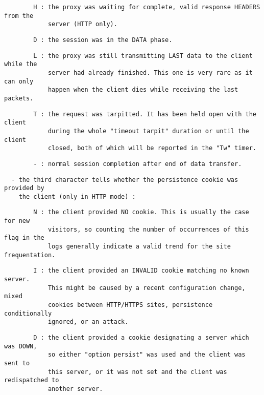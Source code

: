 \begin{verbatim}
        H : the proxy was waiting for complete, valid response HEADERS from the
            server (HTTP only).
\end{verbatim}

\begin{verbatim}
        D : the session was in the DATA phase.
\end{verbatim}

\begin{verbatim}
        L : the proxy was still transmitting LAST data to the client while the
            server had already finished. This one is very rare as it can only
            happen when the client dies while receiving the last packets.
\end{verbatim}

\begin{verbatim}
        T : the request was tarpitted. It has been held open with the client
            during the whole "timeout tarpit" duration or until the client
            closed, both of which will be reported in the "Tw" timer.
\end{verbatim}

\begin{verbatim}
        - : normal session completion after end of data transfer.
\end{verbatim}

\begin{verbatim}
  - the third character tells whether the persistence cookie was provided by
    the client (only in HTTP mode) :
\end{verbatim}

\begin{verbatim}
        N : the client provided NO cookie. This is usually the case for new
            visitors, so counting the number of occurrences of this flag in the
            logs generally indicate a valid trend for the site frequentation.
\end{verbatim}

\begin{verbatim}
        I : the client provided an INVALID cookie matching no known server.
            This might be caused by a recent configuration change, mixed
            cookies between HTTP/HTTPS sites, persistence conditionally
            ignored, or an attack.
\end{verbatim}

\begin{verbatim}
        D : the client provided a cookie designating a server which was DOWN,
            so either "option persist" was used and the client was sent to
            this server, or it was not set and the client was redispatched to
            another server.
\end{verbatim}

